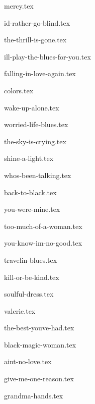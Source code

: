 \begin{songs}{}

  {mercy.tex}
  \sclearpage

  {id-rather-go-blind.tex}  
  \sclearpage

  {the-thrill-is-gone.tex}
  \sclearpage

  {ill-play-the-blues-for-you.tex}
  \sclearpage
      
  {falling-in-love-again.tex}  
  \sclearpage

  {colors.tex}
  \sclearpage

  {wake-up-alone.tex}
  \sclearpage

  {worried-life-blues.tex}
  \sclearpage

  {the-sky-is-crying.tex}
  \sclearpage

  {shine-a-light.tex}  
  \sclearpage

  {whos-been-talking.tex}
  \sclearpage

  {back-to-black.tex}
  \sclearpage
    
  {you-were-mine.tex}
  \sclearpage

  {too-much-of-a-woman.tex}
  \sclearpage

  {you-know-im-no-good.tex}
  \sclearpage

  {travelin-blues.tex}
  \sclearpage

  {kill-or-be-kind.tex}
  \sclearpage
  
  {soulful-dress.tex}
  \sclearpage

  {valerie.tex}
  \sclearpage
  
  {the-best-youve-had.tex}
  \sclearpage

  {black-magic-woman.tex}
  \sclearpage
  
  {aint-no-love.tex}
  \sclearpage
      
  {give-me-one-reason.tex}
  \sclearpage

  {grandma-hands.tex}
  \sclearpage
    

\end{songs}
